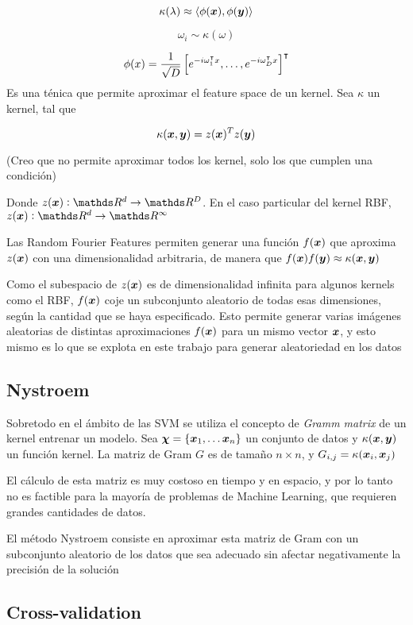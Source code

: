 \begin{equation}
  \kappa(\lambda) \approx \langle\phi(\bm{x}), \phi(\bm{y})\rangle
\end{equation}

\begin{equation}
  \omega_i \sim \kappa(\omega)
\end{equation}

\begin{equation}
  \phi(x) = \frac{1}{\sqrt{D}}\left[ e^{-i\omega^\intercal_1x}, \ldots, e^{-i\omega^\intercal_Dx} \right]^\intercal
\end{equation}
Es una ténica que permite aproximar el feature space de un kernel. Sea $\kappa$
un kernel, tal que

\begin{equation}
 \kappa(\bm{x}, \bm{y}) = z(\bm{x})^Tz(\bm{y})
\end{equation}

(Creo que no permite aproximar todos los kernel, solo los que cumplen una condición)

Donde
$z(\vx) : \reals^d \rightarrow \reals^D$.
En el caso particular del
kernel RBF,
$z(\vx) : \reals^d \rightarrow \reals^\infty$

Las Random Fourier Features permiten generar una función $f(\bm{x})$ que aproxima $z(\bm{x})$
con una dimensionalidad arbitraria, de manera que
$f(\bm{x})f(\bm{y}) \approx \kappa(\bm{x}, \bm{y})$

Como el subespacio de $z(\bm{x})$ es de dimensionalidad infinita para algunos kernels
como el RBF, $f(\bm{x})$ coje un subconjunto aleatorio de todas esas dimensiones,
según la cantidad que se haya especificado. Esto permite generar varias imágenes
aleatorias de distintas aproximaciones $f(\bm{x})$ para un mismo vector $\bm{x}$, y esto
mismo es lo que se explota en este trabajo para generar aleatoriedad en los datos

\subsection{Nystroem}

Sobretodo en el ámbito de las SVM se utiliza el concepto de \textit{Gramm matrix}
de un kernel entrenar un modelo. Sea
$\bm{\chi} = \{\bm{x}_1, \ldots \bm{x}_n\}$
un conjunto de datos y
$\kappa(\bm{x}, \bm{y})$
un función kernel. La matriz de Gram $G$
es de tamaño $n \times n$, y
$G_{i,j} = \kappa(\bm{x}_i, \bm{x}_j)$

El cálculo de esta matriz es muy costoso en tiempo y en espacio, y por lo tanto
no es factible para la mayoría de problemas de Machine Learning, que requieren
grandes cantidades de datos.

El método Nystroem consiste en aproximar esta matriz de Gram con un subconjunto
aleatorio de los datos que sea adecuado sin afectar negativamente la precisión
de la solución
\subsection{Cross-validation}

